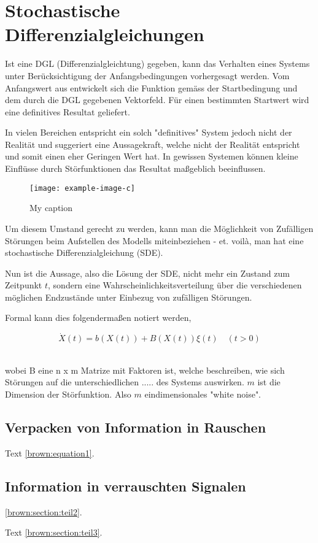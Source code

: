 %
%
%
%
\section{Stochastische Differenzialgleichungen\label{brown:section:teil1}}

Ist eine DGL (Differenzialgleichtung) gegeben, kann das Verhalten eines Systems unter Berücksichtigung der Anfangsbedingungen vorhergesagt werden. Vom Anfangswert aus entwickelt sich die Funktion gemäss der Startbedingung und dem durch die DGL gegebenen Vektorfeld. Für einen bestimmten Startwert wird eine definitives Resultat geliefert.

In vielen Bereichen entspricht ein solch "definitives" System jedoch nicht der Realität und suggeriert eine Aussagekraft, welche nicht der Realität entspricht und somit einen eher Geringen Wert hat. In gewissen Systemen können kleine Einflüsse durch Störfunktionen  das Resultat maßgeblich beeinflussen. 


\begin{figure}
	\caption{My caption}
	\centering
	\noindent\texttt{[image: example-image-c]} \label{fig:label}
\end{figure}


Um diesem Umstand gerecht zu werden, kann man die Möglichkeit von Zufälligen Störungen beim Aufstellen des Modells miteinbeziehen - et. voilà, man hat eine stochastische Differenzialgleichung (SDE).

Nun ist die Aussage, also die Lösung der SDE, nicht mehr ein Zustand zum Zeitpunkt $ t $, sondern eine Wahrscheinlichkeitsverteilung über die verschiedenen möglichen Endzustände unter Einbezug von zufälligen Störungen.

Formal kann dies folgendermaßen notiert werden, 

\begin{equation}
\dot{X}(t) = b(X(t)) + B(X(t))\xi(t) \quad (t>0)
\end{equation}\

wobei B eine n x m Matrize mit Faktoren ist, welche beschreiben, wie sich Störungen auf die unterschiedlichen ..... des Systems auswirken. $ m $ ist die Dimension der Störfunktion. Also $ m $ eindimensionales "white noise".



\subsection{Verpacken von Information in Rauschen
\label{brown:subsection:verpackenVonSignalen}}
Text \eqref{brown:equation1}.

\subsection{Information in verrauschten Signalen
\label{brown:subsection:verrauschteSignale}}
\ref{brown:section:teil2}.

Text
\ref{brown:section:teil3}.



